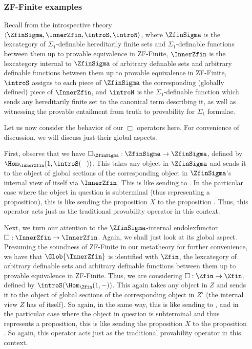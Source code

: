 \subsubsection{ZF-Finite examples}
Recall from  the introspective theory $\langle \ZfinSigma, \InnerZfin, \introS, \introN \rangle$, where $\ZfinSigma$ is the lexcategory of $\Sigma_1$-definable hereditarily finite sets and $\Sigma_1$-definable functions between them up to provable equivalence in ZF-Finite, $\InnerZfin$ is the lexcategory internal to $\ZfinSigma$ of arbitrary definable sets and arbitrary definable functions between them up to provable equivalence in ZF-Finite, $\introS$ assigns to each piece of $\ZfinSigma$ the corresponding (globally defined) piece of $\InnerZfin$, and $\introN$ is the $\Sigma_1$-definable function which sends any hereditarily finite set to the canonical term describing it, as well as witnessing the provable entailment from truth to provability for $\Sigma_1$ formulae.

Let us now consider the behavior of our $\Box$ operators here. For convenience of discussion, we will discuss just their global aspects.

First, observe that we have $\Box_{\ZfinSigma} : \ZfinSigma \to \ZfinSigma$, defined by $\Hom_{\InnerZfin}(1, \introS(-))$. This takes any object in $\ZfinSigma$ and sends it to the object of global sections of the corresponding object in $\ZfinSigma$'s internal view of itself via $\InnerZfin$. This is like sending  to . In the particular case where the object in question is subterminal (thus representing a proposition), this is like sending the proposition $X$ to the proposition . Thus, this operator acts just as the traditional provability operator in this context.

Next, we turn our attention to the $\ZfinSigma$-internal endolexfunctor $\Box : \InnerZfin \to \InnerZfin$. Again, we shall just look at its global aspect. Presuming the soundness of ZF-Finite in our metatheory for further convenience, we have that $\Glob{\InnerZfin}$ is identified with $\Zfin$, the lexcategory of arbitrary definable sets and arbitrary definable functions between them up to provable equivalence in ZF-Finite. Thus, we are considering $\Box : \Zfin \to \Zfin$, defined by $\introS(\Hom_{\Zfin}(1, -))$. This again takes any object in $Z$ and sends it to the object of global sections of the corresponding object in $Z'$ (the internal view $Z$ has of itself). So again, in the same way, this is like sending  to , and in the particular case where the object in question is subterminal and thus represents a proposition, this is like sending the proposition $X$ to the proposition . So again, this operator acts just as the traditional provability operator in this context.

